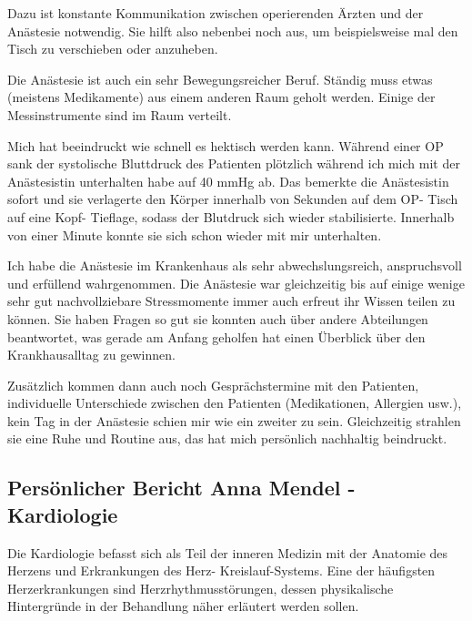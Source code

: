 \documentclass[11pt,a4paper,titlepage]{scrartcl}
\begin{document}
Dazu ist konstante Kommunikation zwischen operierenden Ärzten und der Anästesie notwendig. Sie hilft also nebenbei noch aus, um beispielsweise mal den Tisch zu verschieben oder anzuheben. \medskip

Die Anästesie ist auch ein sehr Bewegungsreicher Beruf. Ständig muss etwas (meistens Medikamente) aus einem anderen Raum geholt werden. Einige der Messinstrumente sind im Raum verteilt. \medskip

Mich hat beeindruckt wie schnell es hektisch werden kann. Während einer OP sank der systolische Bluttdruck des Patienten plötzlich während ich mich mit der Anästesistin unterhalten habe auf 40 mmHg ab. Das bemerkte die Anästesistin sofort und sie verlagerte den Körper innerhalb von Sekunden auf dem OP- Tisch auf eine Kopf- Tieflage, sodass der Blutdruck sich wieder stabilisierte. Innerhalb von einer Minute konnte sie sich schon wieder mit mir unterhalten. \medskip

Ich habe die Anästesie im Krankenhaus als sehr abwechslungsreich, anspruchsvoll und erfüllend wahrgenommen. Die Anästesie war gleichzeitig bis auf einige wenige sehr gut nachvollziebare Stressmomente immer auch erfreut ihr Wissen teilen zu können. Sie haben Fragen so gut sie konnten auch über andere Abteilungen beantwortet, was gerade am Anfang geholfen hat einen Überblick über den Krankhausalltag zu gewinnen. \medskip

Zusätzlich kommen dann auch noch Gesprächstermine mit den Patienten, individuelle Unterschiede zwischen den Patienten (Medikationen, Allergien usw.), kein Tag in der Anästesie schien mir wie ein zweiter zu sein. Gleichzeitig strahlen sie eine Ruhe und Routine aus, das hat mich persönlich nachhaltig beindruckt.








\newpage


\subsection{Persönlicher Bericht Anna Mendel - Kardiologie}

Die Kardiologie befasst sich als Teil der inneren Medizin mit der Anatomie des Herzens und Erkrankungen des Herz-
Kreislauf-Systems.
Eine der häufigsten Herzerkrankungen sind Herzrhythmusstörungen, dessen physikalische Hintergründe in der Behandlung näher erläutert werden sollen.\medskip
\end{document}
